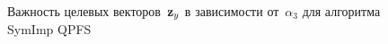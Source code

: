 \begin{figure}[ht]
	\begin{minipage}{.5\linewidth}
	\end{minipage}%
	\begin{minipage}{.5\linewidth}
	\end{minipage}\par\medskip
	
	\caption{Важность целевых векторов~$\mathbf{z}_y$ в зависимости от~$\alpha_3$ для алгоритма SymImp QPFS}
	\label{fig:features_vs_alpha_ecog}
\end{figure}

